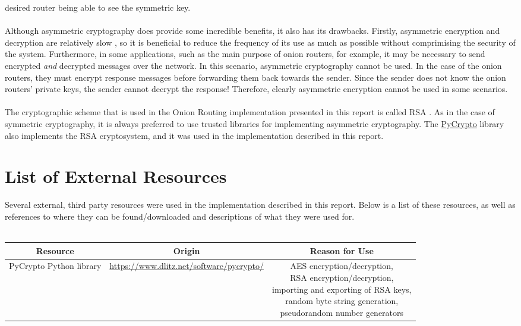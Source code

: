 \documentclass[10pt]{report}
\begin{document}
\begin{appendix}
    desired router being able to see the symmetric key.\\\\
    Although asymmetric cryptography does provide some incredible benefits, it also has its
    drawbacks. Firstly, asymmetric encryption and decryption are relatively slow
    \cite{SymmetricVsAsymmetric}, so it is beneficial to reduce the frequency of its use as much as
    possible without comprimising the security of the system. Furthermore, in some applications,
    such as the main purpose of onion routers, for example, it may be necessary to send encrypted
    \textit{and} decrypted messages over the network. In this scenario, asymmetric cryptography
    cannot be used. In the case of the onion routers, they must encrypt response messages before
    forwarding them back towards the sender. Since the sender does not know the onion routers'
    private keys, the sender cannot decrypt the response! Therefore, clearly asymmetric encryption
    cannot be used in some scenarios.\\\\
    The cryptographic scheme that is used in the Onion Routing implementation presented in this
    report is called RSA \cite{RSA}. As in the case of symmetric cryptography, it is always
    preferred to use trusted libraries for implementing asymmetric cryptography. The
    \href{https://www.dlitz.net/software/pycrypto/}{PyCrypto} library also implements the RSA
    cryptosystem, and it was used in the implementation described in this report.
    \chapter{List of External Resources}
    Several external, third party resources were used in the implementation described in this
    report. Below is a list of these resources, as well as references to where they can be
    found/downloaded and descriptions of what they were used for.\\\\
    \begin{tabular}{|c|c|c|}
        \hline
        \textbf{Resource} & \textbf{Origin} & \textbf{Reason for Use}\\\hline
        PyCrypto Python library & \url{https://www.dlitz.net/software/pycrypto/} & \makecell{AES
        encryption/decryption,\\RSA encryption/decryption,\\importing and exporting of RSA keys,\\random
        byte string generation,\\pseudorandom number generators}\\\hline
    \end{tabular}
\end{appendix}



\end{document}
